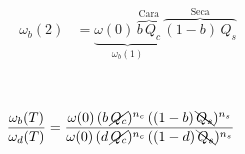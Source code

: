\documentclass[a4paper,10pt]{article}
\begin{document}
\begin{figure}[ht!]
 \centering
 \begin{subfigure}[b]{0.44\textwidth}
 \begin{equation*}
\begin{split}
\omega_b(2) & = \underbrace{\omega(0) \, \overbrace{b \,  Q_c}^{\text{Cara}}}_{\omega_b(1)} \, \overbrace{(1-b) \, Q_s}^{\text{Seca}}
\end{split}
\end{equation*}
 \end{subfigure}
 \
 \begin{subfigure}[b]{0.54\textwidth}
  \begin{equation}
\begin{split}
& \frac{\omega_b(T)}{\omega_d(T)} = \frac{\omega(0) \,  (b \,  \cancel{Q_c})^{n_c}  \,  ((1-b) \, \bcancel{Q_s})^{n_s}}{\omega(0) \,   (d \,  \cancel{Q_c})^{n_c}  \,  ((1-d) \, \bcancel{Q_s})^{n_s}}
\end{split}
\end{equation}
 \end{subfigure}
\end{figure}
\vspace{-0.1cm}

%
\end{document}

